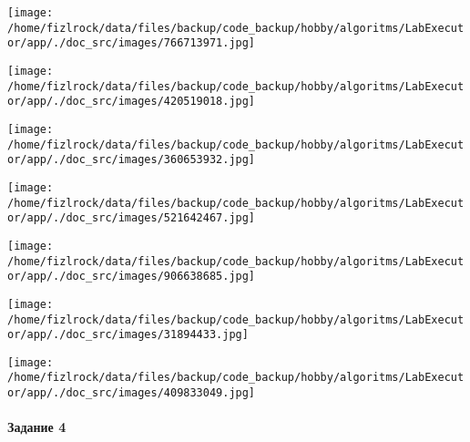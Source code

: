 \documentclass[a4paper, 12pt]{article}
\begin{document}
\texttt{[image: /home/fizlrock/data/files/backup/code\_backup/hobby/algoritms/LabExecutor/app/./doc\_src/images/766713971.jpg]}

\texttt{[image: /home/fizlrock/data/files/backup/code\_backup/hobby/algoritms/LabExecutor/app/./doc\_src/images/420519018.jpg]}

\texttt{[image: /home/fizlrock/data/files/backup/code\_backup/hobby/algoritms/LabExecutor/app/./doc\_src/images/360653932.jpg]}

\texttt{[image: /home/fizlrock/data/files/backup/code\_backup/hobby/algoritms/LabExecutor/app/./doc\_src/images/521642467.jpg]}

\texttt{[image: /home/fizlrock/data/files/backup/code\_backup/hobby/algoritms/LabExecutor/app/./doc\_src/images/906638685.jpg]}

\texttt{[image: /home/fizlrock/data/files/backup/code\_backup/hobby/algoritms/LabExecutor/app/./doc\_src/images/31894433.jpg]}

\texttt{[image: /home/fizlrock/data/files/backup/code\_backup/hobby/algoritms/LabExecutor/app/./doc\_src/images/409833049.jpg]}
\pagebreak
\paragraph{Задание 4}
\end{document}
